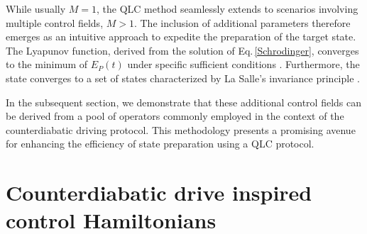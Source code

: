 \documentclass[twocolumn,aps,superscriptaddress,floatfix,longbibliography]{revtex4-2}
\DeclareMathOperator{\sgn}{sign} %
\newcommand{\Eq}[1]{Eq.\,\eqref{#1}}
\begin{document}
While usually $M=1$,
the QLC method seamlessly extends to scenarios involving
multiple control fields, $M>1$. 
The inclusion of additional parameters therefore emerges as an
intuitive approach to expedite the preparation of the target
state.
The Lyapunov function, derived from the solution
of \Eq{Schrodinger}, converges to the minimum of $E_P(t)$
under specific sufficient conditions \cite{grivopoulos2003lyapunov,
QLC_Beauchard_2007, QLC_Zhao_2012, QLC_Wang_2013}. Furthermore,
the state converges to a set of states characterized by La
Salle’s invariance principle \cite{la1976stability}.


In the subsequent section, we demonstrate that these additional
control fields can be derived from a pool of operators commonly
employed in the context of the counterdiabatic driving protocol.
This methodology presents a promising avenue for
enhancing the efficiency of state preparation using a QLC protocol.


\section{Counterdiabatic drive inspired control Hamiltonians}
\label{sec:CD}
\end{document}
